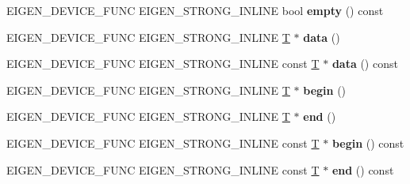 \begin{DoxyCompactItemize}
\mbox{\label{class_eigen_1_1_max_size_vector_afe88367ec2ceb25dc34553875a619396}} 
E\+I\+G\+E\+N\+\_\+\+D\+E\+V\+I\+C\+E\+\_\+\+F\+U\+NC E\+I\+G\+E\+N\+\_\+\+S\+T\+R\+O\+N\+G\+\_\+\+I\+N\+L\+I\+NE bool {\bfseries empty} () const
\item 
\mbox{\label{class_eigen_1_1_max_size_vector_aaec47c5d1dd5aebc4203234a17f6eb4d}} 
E\+I\+G\+E\+N\+\_\+\+D\+E\+V\+I\+C\+E\+\_\+\+F\+U\+NC E\+I\+G\+E\+N\+\_\+\+S\+T\+R\+O\+N\+G\+\_\+\+I\+N\+L\+I\+NE \hyperlink{group___sparse_core___module}{T} $\ast$ {\bfseries data} ()
\item 
\mbox{\label{class_eigen_1_1_max_size_vector_afcfef523d67f0efe33d33e8dfeada3f4}} 
E\+I\+G\+E\+N\+\_\+\+D\+E\+V\+I\+C\+E\+\_\+\+F\+U\+NC E\+I\+G\+E\+N\+\_\+\+S\+T\+R\+O\+N\+G\+\_\+\+I\+N\+L\+I\+NE const \hyperlink{group___sparse_core___module}{T} $\ast$ {\bfseries data} () const
\item 
\mbox{\label{class_eigen_1_1_max_size_vector_aba5c7b789a2cb0395a6a8db0e451e915}} 
E\+I\+G\+E\+N\+\_\+\+D\+E\+V\+I\+C\+E\+\_\+\+F\+U\+NC E\+I\+G\+E\+N\+\_\+\+S\+T\+R\+O\+N\+G\+\_\+\+I\+N\+L\+I\+NE \hyperlink{group___sparse_core___module}{T} $\ast$ {\bfseries begin} ()
\item 
\mbox{\label{class_eigen_1_1_max_size_vector_aebb12f1c135e40ff95e32f48d6101dc2}} 
E\+I\+G\+E\+N\+\_\+\+D\+E\+V\+I\+C\+E\+\_\+\+F\+U\+NC E\+I\+G\+E\+N\+\_\+\+S\+T\+R\+O\+N\+G\+\_\+\+I\+N\+L\+I\+NE \hyperlink{group___sparse_core___module}{T} $\ast$ {\bfseries end} ()
\item 
\mbox{\label{class_eigen_1_1_max_size_vector_a13cce661fb4944b99472f5b0043f04d9}} 
E\+I\+G\+E\+N\+\_\+\+D\+E\+V\+I\+C\+E\+\_\+\+F\+U\+NC E\+I\+G\+E\+N\+\_\+\+S\+T\+R\+O\+N\+G\+\_\+\+I\+N\+L\+I\+NE const \hyperlink{group___sparse_core___module}{T} $\ast$ {\bfseries begin} () const
\item 
\mbox{\label{class_eigen_1_1_max_size_vector_a257f3df4998e80a057b18daf5e1b5fc9}} 
E\+I\+G\+E\+N\+\_\+\+D\+E\+V\+I\+C\+E\+\_\+\+F\+U\+NC E\+I\+G\+E\+N\+\_\+\+S\+T\+R\+O\+N\+G\+\_\+\+I\+N\+L\+I\+NE const \hyperlink{group___sparse_core___module}{T} $\ast$ {\bfseries end} () const
\end{DoxyCompactItemize}


